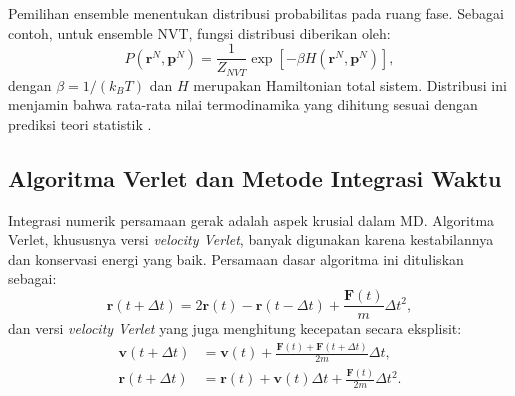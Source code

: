 Pemilihan ensemble menentukan distribusi probabilitas pada ruang fase. Sebagai contoh, untuk ensemble NVT, fungsi distribusi diberikan oleh:
\begin{equation}
    P(\mathbf{r}^N, \mathbf{p}^N) = \frac{1}{Z_{NVT}} \exp\left[-\beta H(\mathbf{r}^N, \mathbf{p}^N)\right],
\end{equation}
dengan \(\beta = 1/(k_B T)\) dan \(H\) merupakan Hamiltonian total sistem. Distribusi ini menjamin bahwa rata-rata nilai termodinamika yang dihitung sesuai dengan prediksi teori statistik \citep{Kardar2007}. \subsection{Algoritma Verlet dan Metode Integrasi Waktu}
Integrasi numerik persamaan gerak adalah aspek krusial dalam MD. Algoritma Verlet, khususnya versi \emph{velocity Verlet}, banyak digunakan karena kestabilannya dan konservasi energi yang baik. Persamaan dasar algoritma ini dituliskan sebagai:
\begin{equation}
    \mathbf{r}(t+\Delta t) = 2\mathbf{r}(t) - \mathbf{r}(t-\Delta t) + \frac{\mathbf{F}(t)}{m}\Delta t^2,
\end{equation}
dan versi \emph{velocity Verlet} yang juga menghitung kecepatan secara eksplisit:
\begin{align}
    \mathbf{v}(t+\Delta t) &= \mathbf{v}(t) + \frac{\mathbf{F}(t) + \mathbf{F}(t+\Delta t)}{2m}\Delta t, \\
    \mathbf{r}(t+\Delta t) &= \mathbf{r}(t) + \mathbf{v}(t)\Delta t + \frac{\mathbf{F}(t)}{2m}\Delta t^2.
 \end{align}

